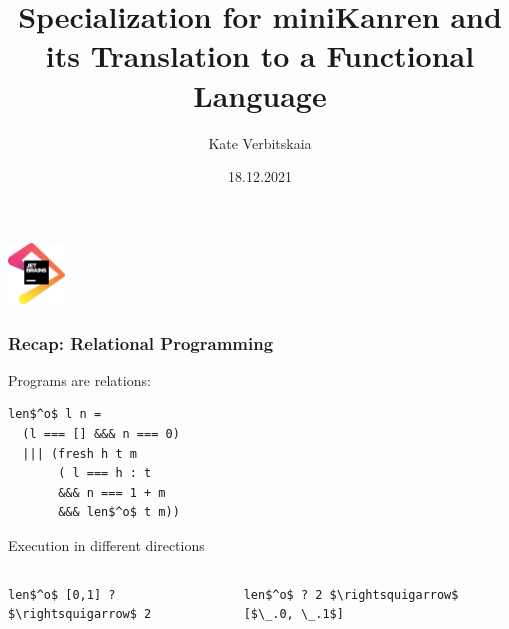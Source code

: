 \documentclass{beamer}
\title[]{Specialization for miniKanren and its Translation to a Functional Language}
\institute[]{
JetBrains Programming Languages and Tools Lab
}
\author[Kate Verbitskaia]{Kate Verbitskaia}
\date{18.12.2021}
\begin{document}
{

\begin{frame}
      \begin{center}
        {\includegraphics[width=1.5cm]{pics/jb.png}}
      \end{center}

  \titlepage
\end{frame}
}

\begin{frame}[fragile]
  \frametitle{Recap: Relational Programming}

 \begin{center}
    Programs are relations:
 \end{center}

 \vspace{0.1cm}

  \begin{center}
    \begin{minipage}{3.5cm}
    \begin{lstlisting}[frame=single]
len$^o$ l n =
  (l === [] &&& n === 0)
  ||| (fresh h t m
       ( l === h : t
       &&& n === 1 + m
       &&& len$^o$ t m))
    \end{lstlisting}
    \end{minipage}
\end{center}

\vspace{0.3cm}

\begin{center}
  Execution in different directions
\end{center}

\vspace{-0.1cm}

\begin{columns}
  \begin{column}{0.45\textwidth}
    \begin{center}
      \begin{minipage}{0.45\textwidth}
        \lstinline{len$^o$ [0,1] ? $\rightsquigarrow$ 2}
      \end{minipage}
    \end{center}
  \end{column}
  \begin{column}{0.55\textwidth}
    \begin{center}
      \begin{minipage}{0.55\textwidth}
        \lstinline{len$^o$ ? 2 $\rightsquigarrow$ [$\_.0, \_.1$]}
      \end{minipage}
    \end{center}
  \end{column}
\end{columns}

\end{frame}
\end{document}
